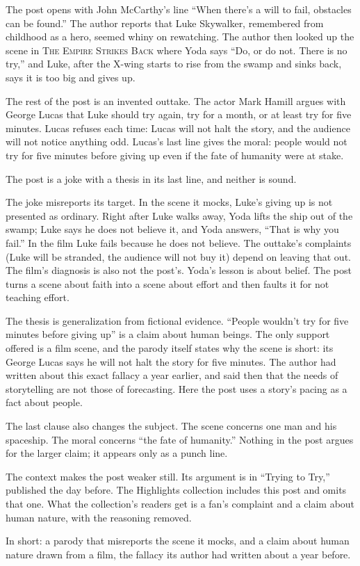 \begin{afterword}
\summaryhead

The post opens with John McCarthy's line ``When there's a will to fail, obstacles can be found.'' The author reports that Luke Skywalker, remembered from childhood as a hero, seemed whiny on rewatching. The author then looked up the scene in \textsc{The Empire Strikes Back} where Yoda says ``Do, or do not. There is no try,'' and Luke, after the X-wing starts to rise from the swamp and sinks back, says it is too big and gives up.

The rest of the post is an invented outtake. The actor Mark Hamill argues with George Lucas that Luke should try again, try for a month, or at least try for five minutes. Lucas refuses each time: Lucas will not halt the story, and the audience will not notice anything odd. Lucas's last line gives the moral: people would not try for five minutes before giving up even if the fate of humanity were at stake.

\responsehead

The post is a joke with a thesis in its last line, and neither is sound.

The joke misreports its target. In the scene it mocks, Luke's giving up is not presented as ordinary. Right after Luke walks away, Yoda lifts the ship out of the swamp; Luke says he does not believe it, and Yoda answers, ``That is why you fail.'' In the film Luke fails because he does not believe. The outtake's complaints (Luke will be stranded, the audience will not buy it) depend on leaving that out. The film's diagnosis is also not the post's. Yoda's lesson is about belief. The post turns a scene about faith into a scene about effort and then faults it for not teaching effort.

The thesis is generalization from fictional evidence. ``People wouldn't try for five minutes before giving up'' is a claim about human beings. The only support offered is a film scene, and the parody itself states why the scene is short: its George Lucas says he will not halt the story for five minutes. The author had written about this exact fallacy a year earlier, and said then that the needs of storytelling are not those of forecasting. Here the post uses a story's pacing as a fact about people.

The last clause also changes the subject. The scene concerns one man and his spaceship. The moral concerns ``the fate of humanity.'' Nothing in the post argues for the larger claim; it appears only as a punch line.

The context makes the post weaker still. Its argument is in ``Trying to Try,'' published the day before. The Highlights collection includes this post and omits that one. What the collection's readers get is a fan's complaint and a claim about human nature, with the reasoning removed.

In short: a parody that misreports the scene it mocks, and a claim about human nature drawn from a film, the fallacy its author had written about a year before.
\end{afterword}
